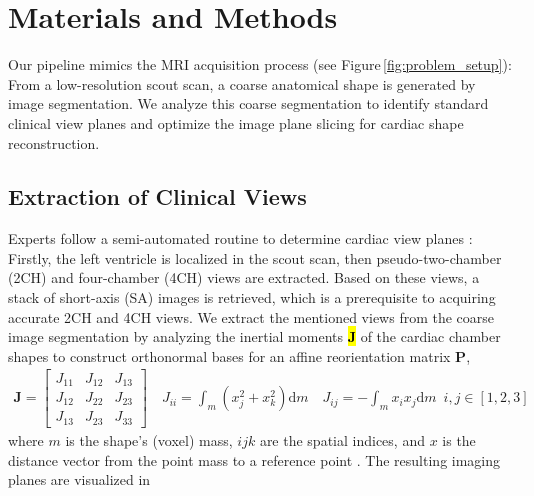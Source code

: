 \section{Materials and Methods}
    \label{sec:method}
     Our pipeline mimics the MRI acquisition process (see Figure\,\ref{fig:problem_setup}): From a low-resolution scout scan, a coarse anatomical shape is generated by image segmentation.
    We analyze this coarse segmentation to identify standard clinical view planes and optimize the image plane slicing for cardiac shape reconstruction.
    \subsection{Extraction of Clinical Views}
    \label{sec:view_extraction}
     Experts follow a semi-automated routine to determine cardiac view planes \cite{herzog2017cardiovascular}: Firstly, the left ventricle is localized in the scout scan, then pseudo-two-chamber (2CH) and four-chamber (4CH) views are extracted. Based on these views, a stack of short-axis (SA) images is retrieved, which is a prerequisite to acquiring accurate 2CH and 4CH views.
    We extract the mentioned views from the coarse image segmentation by analyzing the inertial moments \hl{$\mathbf{J}$} %
 of the cardiac chamber shapes to construct orthonormal bases for an affine reorientation matrix $\mathbf{P}$,
    \begin{align}
        \mathbf{J} = \begin{bmatrix}
            J_{11} & J_{12} & J_{13}\\
            J_{12} & J_{22} & J_{23}\\
            J_{13} & J_{23} & J_{33}
            \end{bmatrix} \quad  J_{ii}= \int_{m} \left(x_j^2 + x_k^2\right) \text{d}m \quad J_{ij} = -\int_{m} x_i x_j \text{d}m \enspace i,j \in \left[1,2,3\right]
        \label{eq:inertia}
    \end{align}
    where $m$ is the shape's (voxel) mass, $ijk$ are the spatial indices, and $x$ is the distance vector from the point mass to a reference point \cite{czichos2012huette}. The resulting imaging planes are visualized in  %

